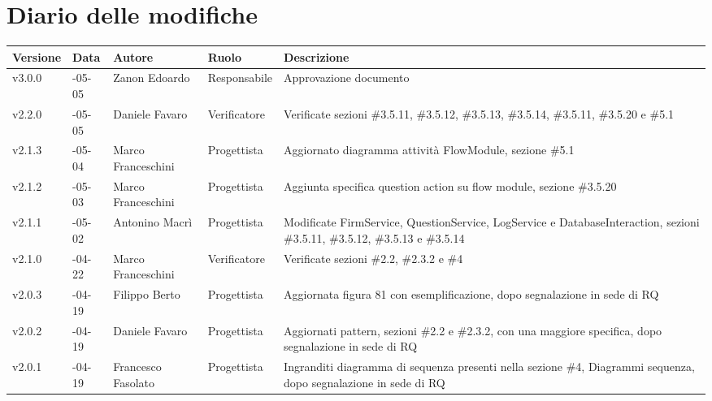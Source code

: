 \vspace*{-10mm}
\section*{Diario delle modifiche}
	
\begin{longtable} { >{\centering}p{1.4cm} >{\centering}p{2cm} >{\centering}p{2.3cm} >{\centering}p{2.7cm} p{5.5cm} }
	\toprule
	\textbf{Versione} & \textbf{Data} & \textbf{Autore} & \textbf{Ruolo} & \centerline{\textbf{Descrizione}} \\
	\midrule
	\arrayrulecolor{gray}
	
	v3.0.0 & 2017-05-05 & Zanon Edoardo & Responsabile & Approvazione documento \\
	\addlinespace[0.4em]
	\midrule
	\addlinespace[0.4em]
	v2.2.0 & 2017-05-05 & Daniele Favaro & Verificatore & Verificate sezioni \#3.5.11, \#3.5.12, \#3.5.13, \#3.5.14, \#3.5.11, \#3.5.20 e \#5.1 \\
	\addlinespace[0.4em]
	\midrule
	\addlinespace[0.4em]	
	v2.1.3 & 2017-05-04 & Marco Franceschini & Progettista & Aggiornato diagramma attività FlowModule, sezione \#5.1 \\
	\addlinespace[0.4em]
	\midrule
	\addlinespace[0.4em]
	v2.1.2 & 2017-05-03 & Marco Franceschini & Progettista & Aggiunta specifica question action su flow module, sezione \#3.5.20 \\
	\addlinespace[0.4em]
	\midrule
	\addlinespace[0.4em]
	v2.1.1 & 2017-05-02 & Antonino Macrì & Progettista & Modificate FirmService, QuestionService, LogService e DatabaseInteraction, sezioni \#3.5.11, \#3.5.12, \#3.5.13 e \#3.5.14 \\
	\addlinespace[0.4em]
	\midrule
	\addlinespace[0.4em]	
	v2.1.0 & 2017-04-22 & Marco Franceschini & Verificatore & Verificate sezioni \#2.2, \#2.3.2 e \#4 \\
	\addlinespace[0.4em]
	\midrule
	\addlinespace[0.4em]
	v2.0.3 & 2017-04-19 & Filippo Berto & Progettista & Aggiornata figura 81 con esemplificazione, dopo segnalazione in sede di RQ  \\
	\addlinespace[0.4em]
	\midrule
	\addlinespace[0.4em]
	v2.0.2 & 2017-04-19 & Daniele Favaro & Progettista & Aggiornati pattern, sezioni \#2.2 e \#2.3.2, con una maggiore specifica, dopo segnalazione in sede di RQ \\
	\addlinespace[0.4em]
	\midrule
	\addlinespace[0.4em]
	v2.0.1 & 2017-04-19 & Francesco Fasolato & Progettista & Ingranditi diagramma di sequenza presenti nella sezione \#4, Diagrammi sequenza, dopo segnalazione in sede di RQ \\

\end{longtable}
